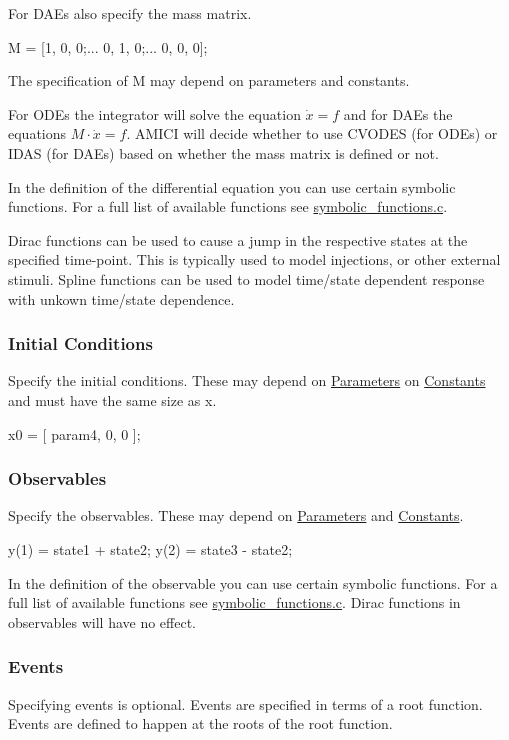For D\+A\+Es also specify the mass matrix.


\begin{DoxyCode}
M = [1, 0, 0;...
0, 1, 0;...
0, 0, 0];
\end{DoxyCode}


The specification of M may depend on parameters and constants.

For O\+D\+Es the integrator will solve the equation $ \dot{x} = f $ and for D\+A\+Es the equations $ M \cdot \dot{x} = f $. A\+M\+I\+C\+I will decide whether to use C\+V\+O\+D\+E\+S (for O\+D\+Es) or I\+D\+A\+S (for D\+A\+Es) based on whether the mass matrix is defined or not.

In the definition of the differential equation you can use certain symbolic functions. For a full list of available functions see \hyperlink{symbolic__functions_8c}{symbolic\+\_\+functions.\+c}.

Dirac functions can be used to cause a jump in the respective states at the specified time-\/point. This is typically used to model injections, or other external stimuli. Spline functions can be used to model time/state dependent response with unkown time/state dependence.\hypertarget{def_simu_init}{}\subsubsection{Initial Conditions}\label{def_simu_init}
Specify the initial conditions. These may depend on \hyperlink{def_simu_parameters}{Parameters} on \hyperlink{def_simu_constants}{Constants} and must have the same size as x.


\begin{DoxyCode}
x0 = [ param4, 0, 0 ]; 
\end{DoxyCode}
\hypertarget{def_simu_observables}{}\subsubsection{Observables}\label{def_simu_observables}
Specify the observables. These may depend on \hyperlink{def_simu_parameters}{Parameters} and \hyperlink{def_simu_constants}{Constants}.


\begin{DoxyCode}
y(1) = state1 + state2;
y(2) = state3 - state2;
\end{DoxyCode}


In the definition of the observable you can use certain symbolic functions. For a full list of available functions see \hyperlink{symbolic__functions_8c}{symbolic\+\_\+functions.\+c}. Dirac functions in observables will have no effect.\hypertarget{def_simu_events}{}\subsubsection{Events}\label{def_simu_events}
Specifying events is optional. Events are specified in terms of a root function. Events are defined to happen at the roots of the root function.


